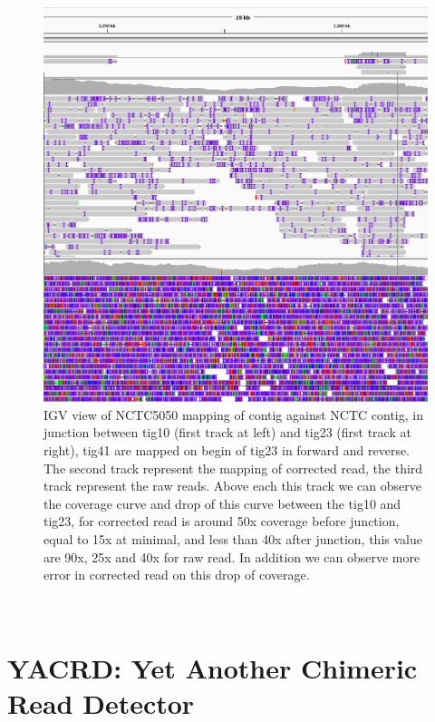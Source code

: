 \documentclass[../../main.tex]{subfiles}
\begin{document}
\begin{figure}[!htbp]
    \centering
    \includegraphics[width=\textwidth]{supplemental/knot/NCTC5050_tig10_tig23.png}
    \caption{IGV view of NCTC5050 mapping of \canu contig against NCTC contig, in junction between tig10 (first track at left) and tig23 (first track at right), tig41 are mapped on begin of tig23 in forward and reverse. The second track represent the mapping of \canu corrected read, the third track represent the raw reads. Above each this track we can observe the coverage curve and drop of this curve between the tig10 and tig23, for corrected read is around 50x coverage before junction, equal to 15x at minimal, and less than 40x after junction, this value are 90x, 25x and 40x for raw read. In addition we can observe more error in corrected read on this drop of coverage.}
    \label{fig:appendix:NCTC5050_tig10_tig23}
\end{figure}

\newpage

~

\section{YACRD: Yet Another Chimeric Read Detector}
\end{document}
